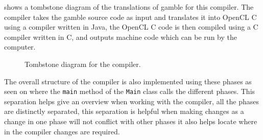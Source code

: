  shows a tombstone diagram of the translations of \gls{gamble} for this compiler.
The compiler takes the \gls{gamble} source code as input and translates it into OpenCL C using a compiler written in Java, the OpenCL C code is then compiled using a C compiler written in C, and outputs machine code which can be run by the computer.
\begin{figure}[!ht]
\centering
{}
\caption{Tombstone diagram for the compiler.}
\label{fig:tombstone}
\end{figure}


The overall structure of the compiler is also implemented using these phases as seen on  where the \texttt{main} method of the \texttt{Main} class calls the different phases.
This separation helps give an overview when working with the compiler, all the phases are distinctly separated, this separation is helpful when making changes as a change in one phase will not conflict with other phases it also helps locate where in the compiler changes are required.

